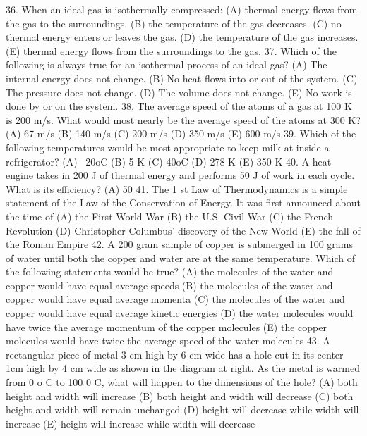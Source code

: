 36. When an ideal gas is isothermally compressed:
(A) thermal energy flows from the gas to the surroundings.
(B) the temperature of the gas decreases.
(C) no thermal energy enters or leaves the gas.
(D) the temperature of the gas increases.
(E) thermal energy flows from the surroundings to the gas.
37. Which of the following is always true for an isothermal process of an ideal gas?
(A) The internal energy does not change.
(B) No heat flows into or out of the system.
(C) The pressure does not change.
(D) The volume does not change.
(E) No work is done by or on the system.
38. The average speed of the atoms of a gas at 100 K is 200 m/s. What would most nearly be the average speed of
the atoms at 300 K?
(A) 67 m/s (B) 140 m/s (C) 200 m/s (D) 350 m/s (E) 600 m/s
39. Which of the following temperatures would be most appropriate to keep milk at inside a refrigerator?
(A) –20oC (B) 5 K (C) 40oC (D) 278 K (E) 350 K
40. A heat engine takes in 200 J of thermal energy and performs 50 J of work in each cycle. What is its efficiency?
(A) 50 %
41. The 1 st Law of Thermodynamics is a simple statement of the Law of the Conservation of Energy. It was first
announced about the time of
(A) the First World War
(B) the U.S. Civil War
(C) the French Revolution
(D) Christopher Columbus' discovery of the New World
(E) the fall of the Roman Empire
42. A 200 gram sample of copper is submerged in 100 grams of water until both the copper and water are at the
same temperature. Which of the following statements would be true?
(A) the molecules of the water and copper would have equal average speeds
(B) the molecules of the water and copper would have equal average momenta
(C) the molecules of the water and copper would have equal average kinetic energies
(D) the water molecules would have twice the average momentum of the copper molecules
(E) the copper molecules would have twice the average speed of the water molecules
43. A rectangular piece of metal 3 cm high by 6 cm wide has a hole cut in its center 1cm high by 4 cm wide as
shown in the diagram at right. As the metal is warmed from 0 o C to 100 0 C, what will happen to the dimensions
of the hole?
(A) both height and width will increase
(B) both height and width will decrease
(C) both height and width will remain unchanged
(D) height will decrease while width will increase
(E) height will increase while width will decrease





